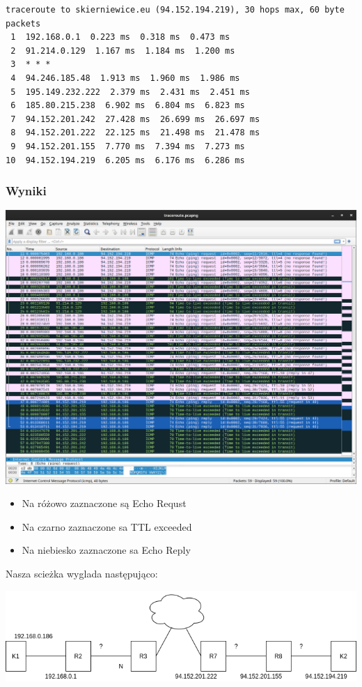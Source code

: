 \documentclass[11pt]{article}
\begin{document}
\begin{verbatim}
traceroute to skierniewice.eu (94.152.194.219), 30 hops max, 60 byte packets
 1  192.168.0.1  0.223 ms  0.318 ms  0.473 ms
 2  91.214.0.129  1.167 ms  1.184 ms  1.200 ms
 3  * * *
 4  94.246.185.48  1.913 ms  1.960 ms  1.986 ms
 5  195.149.232.222  2.379 ms  2.431 ms  2.451 ms
 6  185.80.215.238  6.902 ms  6.804 ms  6.823 ms
 7  94.152.201.242  27.428 ms  26.699 ms  26.697 ms
 8  94.152.201.222  22.125 ms  21.498 ms  21.478 ms
 9  94.152.201.155  7.770 ms  7.394 ms  7.273 ms
10  94.152.194.219  6.205 ms  6.176 ms  6.286 ms
\end{verbatim}
\subsubsection{Wyniki}
\label{sec:org57f3d6e}
\begin{center}
\includegraphics[width=.9\linewidth]{./part1/traceroute.png}
\end{center}
\begin{itemize}
\item Na różowo zaznaczone są Echo Requst
\item Na czarno zaznaczone sa TTL exceeded
\item Na niebiesko zaznaczone sa Echo Reply
\end{itemize}

Nasza scieżka wyglada następująco:
\begin{center}
\includegraphics[width=.9\linewidth]{./part1/part1.png}
\end{center}
\end{document}
